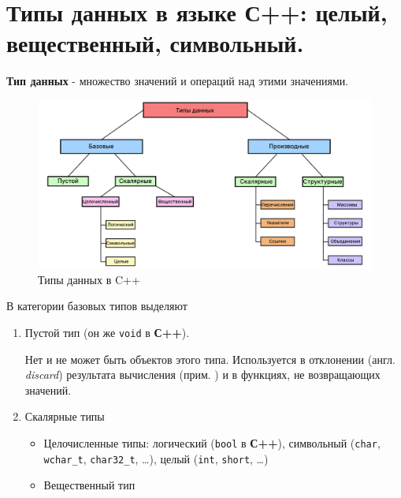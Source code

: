 \section{Типы данных в языке С++: целый, вещественный,
символьный.}\label{ux442ux438ux43fux44b-ux434ux430ux43dux43dux44bux445-ux432-ux44fux437ux44bux43aux435-ux441-ux446ux435ux43bux44bux439-ux432ux435ux449ux435ux441ux442ux432ux435ux43dux43dux44bux439-ux441ux438ux43cux432ux43eux43bux44cux43dux44bux439.}

\textbf{Тип данных} - множество значений и операций над этими
значениями.

\begin{figure}
\centering
\includegraphics{./res/сpp-types.png}
\caption{Типы данных в C++}
\end{figure}

В категории базовых типов выделяют

\begin{enumerate}
\def\labelenumi{\arabic{enumi})}
\item
  Пустой тип (он же \texttt{void} в \textbf{С++}).

  Нет и не может быть объектов этого типа. Используется в отклонении
  (англ. \emph{discard}) результата вычисления (прим.
  ) и в функциях, не
  возвращающих значений.
\item
  Скалярные типы

  \begin{itemize}
  \item
    Целочисленные типы: логический (\texttt{bool} в \textbf{С++}),
    символьный (\texttt{char}, \texttt{wchar\_t}, \texttt{char32\_t},
    \ldots), целый (\texttt{int}, \texttt{short}, \ldots)
  \item
    Вещественный тип
  \end{itemize}
\end{enumerate}

